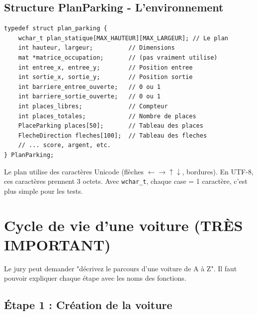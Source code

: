 \documentclass[11pt,a4paper]{article}
\newcommand{\code}[1]{\texttt{\textcolor{accent}{#1}}}
\begin{document}
\subsection{Structure PlanParking - L'environnement}

\begin{codebox}
\begin{lstlisting}
typedef struct plan_parking {
    wchar_t plan_statique[MAX_HAUTEUR][MAX_LARGEUR]; // Le plan
    int hauteur, largeur;          // Dimensions
    mat *matrice_occupation;       // (pas vraiment utilise)
    int entree_x, entree_y;        // Position entree
    int sortie_x, sortie_y;        // Position sortie
    int barriere_entree_ouverte;   // 0 ou 1
    int barriere_sortie_ouverte;   // 0 ou 1
    int places_libres;             // Compteur
    int places_totales;            // Nombre de places
    PlaceParking places[50];       // Tableau des places
    FlecheDirection fleches[100];  // Tableau des fleches
    // ... score, argent, etc.
} PlanParking;
\end{lstlisting}
\end{codebox}

\begin{infobox}
Le plan utilise des caractères Unicode (flèches $\leftarrow\rightarrow\uparrow\downarrow$, bordures). En UTF-8, ces caractères prennent 3 octets. Avec \code{wchar\_t}, chaque case = 1 caractère, c'est plus simple pour les tests.
\end{infobox}

\section{Cycle de vie d'une voiture (TRÈS IMPORTANT)}

\begin{dangerbox}
Le jury peut demander "décrivez le parcours d'une voiture de A à Z". Il faut pouvoir expliquer chaque étape avec les noms des fonctions.
\end{dangerbox}

\subsection{Étape 1 : Création de la voiture}
\end{document}
